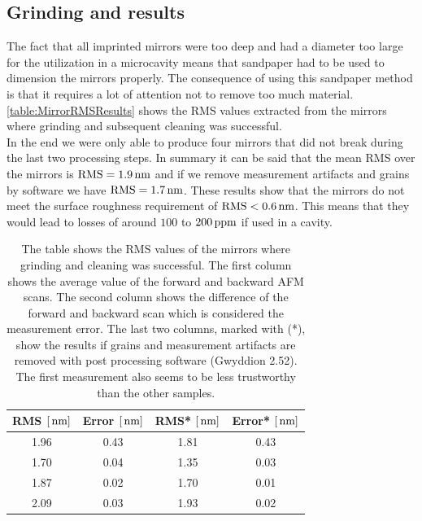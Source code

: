 \subsection{Grinding and results}
The fact that all imprinted mirrors were too deep and had a diameter too large for the utilization in a microcavity means that sandpaper had to be used to dimension the mirrors properly. The consequence of using this sandpaper method is that it requires a lot of attention not to remove too much material. \autoref{table:MirrorRMSResults} shows the RMS values extracted from the mirrors where grinding and subsequent cleaning was successful.\\
In the end we were only able to produce four mirrors that did not break during the last two processing steps. In summary it can be said that the mean RMS over the mirrors is $\si{RMS}=1.9\nm$ and if we remove measurement artifacts and grains by software we have $\si{RMS}=1.7\nm$. These results show that the mirrors do not meet the surface roughness requirement of $\si{RMS}<0.6\nm$. This means that they would lead to losses of around $100$ to $200\ppm$ if used in a cavity.

\begin{table}[H]
	\begin{tabular}{cccc}
	\hline
	\textbf{RMS $[\nm]$} & \textbf{Error $[\nm]$} & \textbf{RMS* $[\nm]$} & \textbf{Error* $[\nm]$} \\
	\hline
	1.96 & 0.43 & 1.81 & 0.43 \\
	1.70 & 0.04 & 1.35 & 0.03 \\
	1.87 & 0.02 & 1.70 & 0.01 \\
	2.09 & 0.03 & 1.93 & 0.02 \\
	\hline
	\end{tabular}
	\caption{The table shows the RMS values of the mirrors where grinding and cleaning was successful. The first column shows the average value of the forward and backward AFM scans. The second column shows the difference of the forward and backward scan which is considered the measurement error. The last two columns, marked with (*), show the results if grains and measurement artifacts are removed with post processing software (Gwyddion 2.52). The first measurement also seems to be less trustworthy than the other samples.}
	\label{table:MirrorRMSResults}
\end{table}


